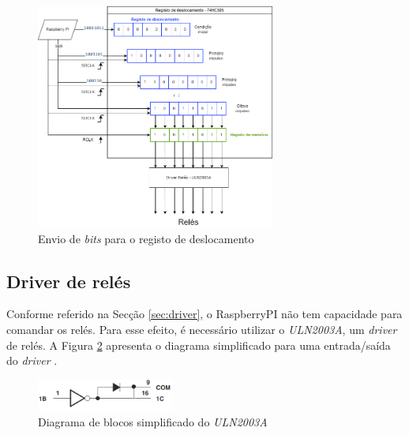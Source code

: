 
\begin{figure}[hbtp]
	\centering
	\includegraphics[width=0.7\textwidth]{figures/registo deslocamente.drawio.png}
	\caption{Envio de \textit{bits} para o registo de deslocamento}
	\label{fig:esquematico74hc595}
\end{figure}

\subsection{Driver de relés}
\label{sec:driverreles}
Conforme referido na Secção \ref{sec:driver}, o \gls{RaspberryPI} não tem capacidade para comandar os relés. Para esse efeito, é necessário utilizar o \textit{ULN2003A}, um \textit{driver} de relés. A Figura \ref{fig:diagramablocos2003} apresenta o diagrama simplificado para uma entrada/saída do \textit{driver} \cite{ULN2003}.

\begin{figure}[hbtp]
	\centering
	\includegraphics[width=0.4\textwidth]{figures/uln2003_diagramablocos.png}
	\caption{Diagrama de blocos simplificado do \textit{ULN2003A}}
	\label{fig:diagramablocos2003}
\end{figure}

